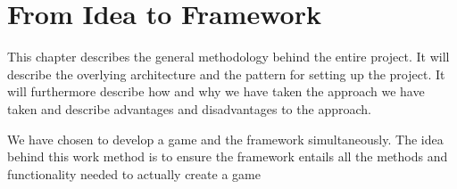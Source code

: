 \chapter{From Idea to Framework}

This chapter describes the general methodology behind the entire project. It will describe the overlying architecture and the pattern for setting up the project. It will furthermore describe how and why we have taken the approach we have taken and describe advantages and disadvantages to the approach. 

We have chosen to develop a game and the framework simultaneously. The idea behind this work method is to ensure the framework entails all the methods and functionality needed to actually create a game



